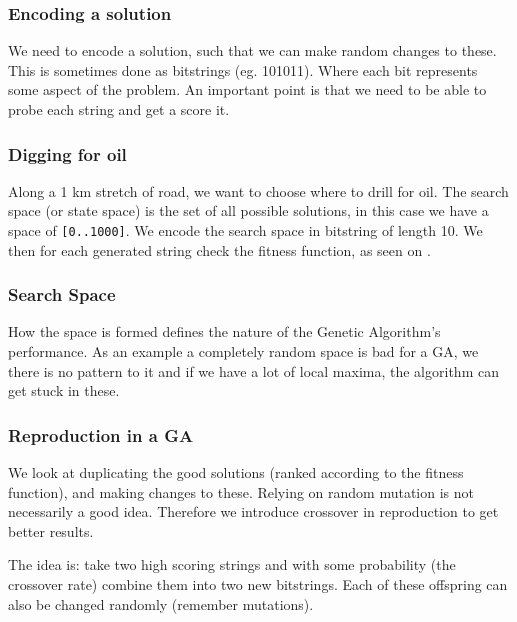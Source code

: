 \documentclass{article}
\begin{document}
\subsubsection{Encoding a solution}%
\label{ssub:encoding_a_solution}

We need to encode a solution, such that we can make random changes to these.
This is sometimes done as bitstrings (eg. 101011). Where each bit represents
some aspect of the problem. An important point is that we need to be able to
probe each string and get a score it.

\subsubsection{Digging for oil}%
\label{ssub:digging_for_oil}

Along a 1 km stretch of road, we want to choose where to drill for oil.
The search space (or state space) is the set of all possible solutions, in this
case we have a space of \texttt{[0..1000]}. We encode the search space in
bitstring of length 10. We then for each generated string check the fitness
function, as seen on \cite[p. 31]{presentation:local_search_algorithms}.

\subsubsection{Search Space}%
\label{ssub:search_space}

How the space is formed defines the nature of the Genetic Algorithm's
performance. As an example a completely random space is bad for a GA, we there
is no pattern to it and if we have a lot of local maxima, the algorithm can get
stuck in these.

\subsubsection{Reproduction in a GA}%
\label{ssub:reproduction_in_a_ga}

We look at duplicating the good solutions (ranked according to the fitness
function), and making changes to these. Relying on random mutation is not
necessarily a good idea. Therefore we introduce crossover in reproduction to get
better results.

The idea is: take two high scoring strings and with some probability (the
crossover rate) combine them into two new bitstrings. Each of these offspring
can also be changed randomly (remember mutations).
\end{document}
